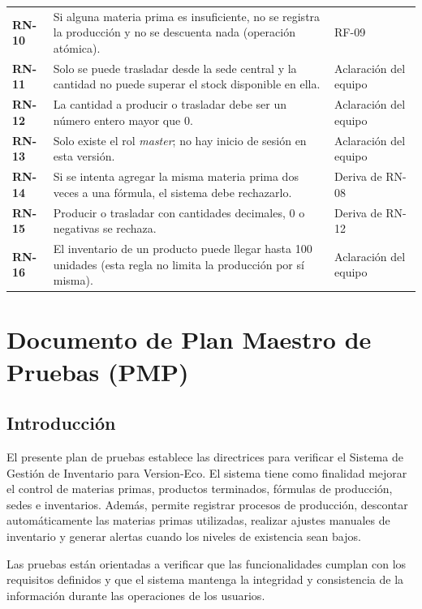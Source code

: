 \documentclass[11pt,a4paper]{article}
\begin{document}
\begin{longtable}{p{1.8cm} p{10.8cm} p{3.2cm}}
\addlinespace
\textbf{RN-10} & Si alguna materia prima es insuficiente, no se registra la producción y no se descuenta nada (operación atómica). & RF-09 \\
\addlinespace
\textbf{RN-11} & Solo se puede trasladar desde la sede central y la cantidad no puede superar el stock disponible en ella. & Aclaración del equipo \\
\addlinespace
\textbf{RN-12} & La cantidad a producir o trasladar debe ser un número entero mayor que 0. & Aclaración del equipo \\
\addlinespace
\textbf{RN-13} & Solo existe el rol \textit{master}; no hay inicio de sesión en esta versión. & Aclaración del equipo \\
\addlinespace
\textbf{RN-14} & Si se intenta agregar la misma materia prima dos veces a una fórmula, el sistema debe rechazarlo. & Deriva de RN-08 \\
\addlinespace
\textbf{RN-15} & Producir o trasladar con cantidades decimales, 0 o negativas se rechaza. & Deriva de RN-12 \\
\addlinespace
\textbf{RN-16} & El inventario de un producto puede llegar hasta 100 unidades (esta regla no limita la producción por sí misma). & Aclaración del equipo \\
\end{longtable}

\section{Documento de Plan Maestro de Pruebas (PMP)}

\subsection{Introducción}
El presente plan de pruebas establece las directrices para verificar el Sistema de Gestión de Inventario para Version-Eco. El sistema tiene como finalidad mejorar el control de materias primas, productos terminados, fórmulas de producción, sedes e inventarios. Además, permite registrar procesos de producción, descontar automáticamente las materias primas utilizadas, realizar ajustes manuales de inventario y generar alertas cuando los niveles de existencia sean bajos.

Las pruebas están orientadas a verificar que las funcionalidades cumplan con los requisitos definidos y que el sistema mantenga la integridad y consistencia de la información durante las operaciones de los usuarios.
\end{document}

